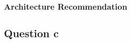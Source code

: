 \documentclass[]{report}
\begin{document}
				\subsubsection{Architecture Recommendation}
				
				
			
			
			\subsection{Question c}


	
	
\end{document}
